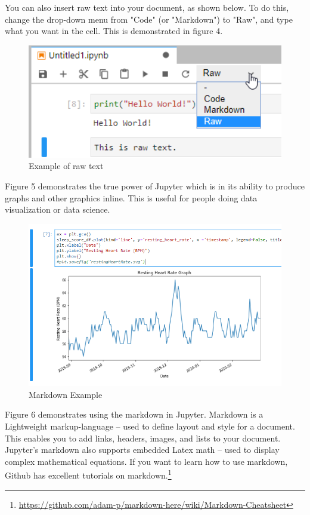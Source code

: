 \documentclass[pdftex,12pt]{artikel3}
\begin{document}
You can also insert raw text into your document, as shown below.
To do this, change the drop-down menu from "Code" (or "Markdown") to "Raw", and type what you want in the cell.
This is demonstrated in figure 4.

\begin{figure}[h!]
    \centering
    \includegraphics[width=15cm]{raw_text_example.png}
    \caption{Example of raw text}
    \label{fig:rawtextexample}
\end{figure}

\newpage

Figure 5 demonstrates the true power of Jupyter which is in its ability to produce graphs and other graphics inline.
This is useful for people doing data visualization or data science.

\begin{figure}[h!]
    \centering
    \includegraphics[width=15cm]{exGraph.PNG}
    \caption{Markdown Example}
    \label{fig:graphingExample}
\end{figure}

\newpage

Figure 6 demonstrates using the markdown in Jupyter. 
Markdown is a Lightweight markup-language -- used to define layout and style for a document.
This enables you to add links, headers, images, and lists to your document.
Jupyter's markdown also supports embedded Latex math -- used to display complex mathematical equations.
If you want to learn how to use markdown, Github has excellent tutorials on markdown.\footnote{\url{https://github.com/adam-p/markdown-here/wiki/Markdown-Cheatsheet}}
\end{document}

